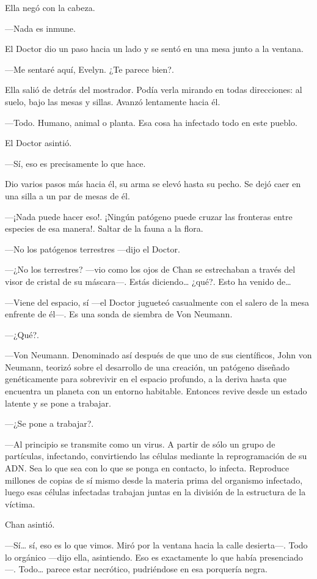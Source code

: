 Ella negó con la cabeza.

---Nada es inmune.

El Doctor dio un paso hacia un lado y se sentó en una mesa junto a la
ventana.

---Me sentaré aquí, Evelyn. ¿Te parece bien?.

Ella salió de detrás del mostrador. Podía verla mirando en todas
direcciones: al suelo, bajo las mesas y sillas. Avanzó lentamente hacia
él.

---Todo. Humano, animal o planta. Esa cosa ha infectado todo en este
pueblo.

El Doctor asintió.

---Sí, eso es precisamente lo que hace.

Dio varios pasos más hacia él, su arma se elevó hasta su pecho. Se dejó
caer en una silla a un par de mesas de él.

---¡Nada puede hacer eso!. ¡Ningún patógeno puede cruzar las fronteras
entre especies de esa manera!. Saltar de la fauna a la flora.

---No los patógenos terrestres ---dijo el Doctor.

---¿No los terrestres? ---vio como los ojos de Chan se estrechaban a
través del visor de cristal de su máscara---. Estás diciendo\ldots{}
¿qué?. Esto ha venido de\ldots{}

---Viene del espacio, sí ---el Doctor jugueteó casualmente con el salero
de la mesa enfrente de él---. Es una sonda de siembra de Von Neumann.

---¿Qué?.

---Von Neumann. Denominado así después de que uno de sus científicos,
John von Neumann, teorizó sobre el desarrollo de una creación, un
patógeno diseñado genéticamente para sobrevivir en el espacio profundo,
a la deriva hasta que encuentra un planeta con un entorno habitable.
Entonces revive desde un estado latente y se pone a trabajar.

---¿Se pone a trabajar?.

---Al principio se transmite como un virus. A partir de sólo un grupo de
partículas, infectando, convirtiendo las células mediante la
reprogramación de su ADN. Sea lo que sea con lo que se ponga en
contacto, lo infecta. Reproduce millones de copias de sí mismo desde la
materia prima del organismo infectado, luego esas células infectadas
trabajan juntas en la división de la estructura de la víctima.

Chan asintió.

---Sí\ldots{} sí, eso es lo que vimos. Miró por la ventana hacia la
calle desierta---. Todo lo orgánico ---dijo ella, asintiendo. Eso es
exactamente lo que había presenciado---. Todo\ldots{} parece estar
necrótico, pudriéndose en esa porquería negra.

